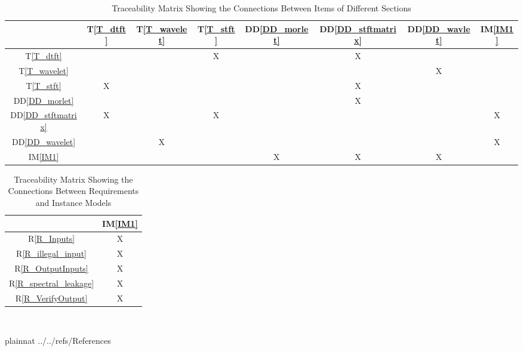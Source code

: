 \documentclass[12pt]{article}
\newcommand{\ddref}[1]{DD\ref{#1}}
\newcommand{\tref}[1]{T\ref{#1}}
\newcommand{\iref}[1]{IM\ref{#1}}
\newcommand{\rref}[1]{R\ref{#1}}
\begin{document}
\begin{table}[h!]
\centering
\begin{tabular}{|c|c|c|c|c|c|c|c|}
\hline        
	& \tref{T_dtft} & \tref{T_wavelet}& \tref{T_stft}& \ddref{DD_morlet} & \ddref{DD_stftmatrix}& \ddref{DD_wavlet} & \iref{IM1} \\
\hline
\hline
\tref{T_dtft}          & & &X& &X& & \\ \hline
\tref{T_wavelet}       & & & & & &X& \\ \hline
\tref{T_stft}        &X& & & &X& & \\ \hline
\ddref{DD_morlet}      & & & & &X& & \\ \hline
\ddref{DD_stftmatrix}  &X& &X& & & &X\\ \hline
\ddref{DD_wavelet}     & &X& & & & &X\\ \hline
\iref{IM1}             & & & &X&X&X \\
\hline
\end{tabular}
\caption{Traceability Matrix Showing the Connections Between Items of Different Sections}
\label{Table:trace}
\end{table}
\begin{table}[h!]
\centering
\begin{tabular}{|c|c|}
\hline
	& \iref{IM1} \\
\hline
\rref{R_Inputs}        &X \\ \hline
\rref{R_illegal_input} &X \\ \hline
\rref{R_OutputInputs}  &X  \\ \hline
\rref{R_spectral_leakage}&X \\ \hline 
\rref{R_VerifyOutput}  &X \\ 
\hline
\end{tabular}
\caption{Traceability Matrix Showing the Connections Between Requirements and Instance Models}
\label{Table:R_trace}
\end{table}




~\newpage

 {plainnat}
 {../../refs/References}
\end{document}
